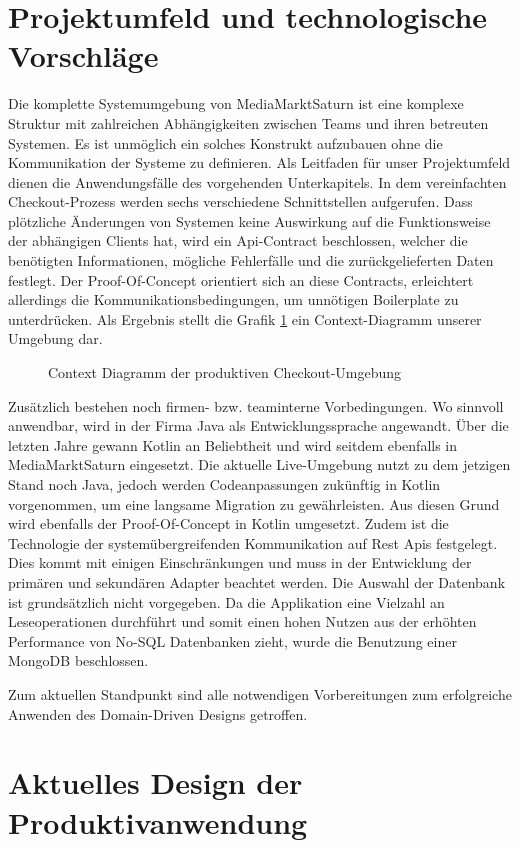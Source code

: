 \section{Projektumfeld und technologische Vorschläge}

Die komplette Systemumgebung von MediaMarktSaturn ist eine komplexe Struktur mit zahlreichen Abhängigkeiten zwischen Teams und ihren betreuten Systemen. Es ist unmöglich ein solches Konstrukt aufzubauen ohne die Kommunikation der Systeme zu definieren. Als Leitfaden für unser Projektumfeld dienen die Anwendungsfälle des vorgehenden Unterkapitels. In dem vereinfachten Checkout-Prozess werden sechs verschiedene Schnittstellen aufgerufen. Dass plötzliche Änderungen von Systemen keine Auswirkung auf die Funktionsweise der abhängigen Clients hat, wird ein Api-Contract beschlossen, welcher die benötigten Informationen, mögliche Fehlerfälle und die zurückgelieferten Daten festlegt. Der Proof-Of-Concept orientiert sich an diese Contracts, erleichtert allerdings die Kommunikationsbedingungen, um unnötigen Boilerplate zu unterdrücken. Als Ergebnis stellt die Grafik \ref{fig:ContextDiagramm} ein Context-Diagramm unserer Umgebung dar.


\begin{figure}[htbp]
	\centering
	
	\caption{Context Diagramm der produktiven Checkout-Umgebung}
	\label{fig:ContextDiagramm}
\end{figure}

Zusätzlich bestehen noch firmen- bzw. teaminterne Vorbedingungen. Wo sinnvoll anwendbar, wird in der Firma Java als Entwicklungssprache angewandt. Über die letzten Jahre gewann Kotlin an Beliebtheit und wird seitdem ebenfalls in MediaMarktSaturn eingesetzt. Die aktuelle Live-Umgebung nutzt zu dem jetzigen Stand noch Java, jedoch werden Codeanpassungen zukünftig in Kotlin vorgenommen, um eine langsame Migration zu gewährleisten. Aus diesen Grund wird ebenfalls der Proof-Of-Concept in Kotlin umgesetzt. Zudem ist die Technologie der systemübergreifenden Kommunikation auf Rest Apis festgelegt. Dies kommt mit einigen Einschränkungen und muss in der Entwicklung der primären und sekundären Adapter beachtet werden. Die Auswahl der Datenbank ist grundsätzlich nicht vorgegeben. Da die Applikation eine Vielzahl an Leseoperationen durchführt und somit einen hohen Nutzen aus der erhöhten Performance von No-SQL Datenbanken zieht, wurde die Benutzung einer MongoDB beschlossen.

Zum aktuellen Standpunkt sind alle notwendigen Vorbereitungen zum erfolgreiche Anwenden des Domain-Driven Designs getroffen.  


\section{Aktuelles Design der Produktivanwendung}
\blindtext

